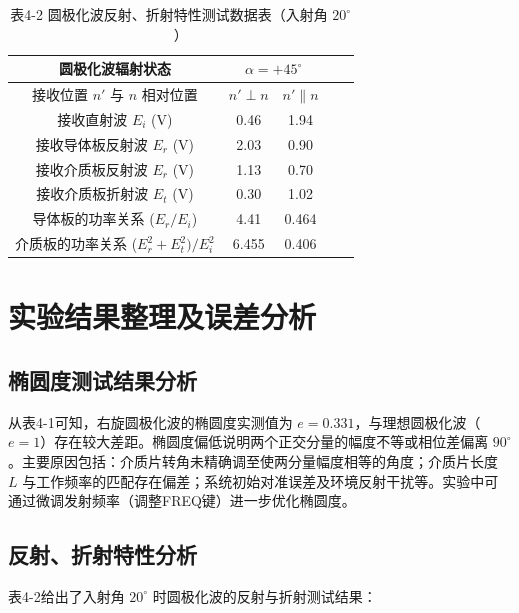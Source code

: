 \documentclass{../ElectromagneticFieldTemplate}
\begin{document}
\begin{table}[H]
    \centering
    \caption{表4-2 圆极化波反射、折射特性测试数据表（入射角 \(20^\circ\)）}
    \renewcommand{\arraystretch}{1.3}
    \begin{tabular}{|c|c|c|c|c|}
        \hline
        圆极化波辐射状态 & \multicolumn{2}{c|}{\(\alpha = +45^\circ\)} \\
        \hline
        接收位置 \(n'\) 与 \(n\) 相对位置 & \(n' \perp n\) & \(n' \parallel n\) \\
        \hline
        接收直射波 \(E_i\) (V) & 0.46 & 1.94\\
        \hline
        接收导体板反射波 \(E_r\) (V) & 2.03 & 0.90 \\
        \hline
        接收介质板反射波 \(E_r\) (V) & 1.13 & 0.70 \\
        \hline
        接收介质板折射波 \(E_t\) (V) & 0.30 & 1.02\\
        \hline
        导体板的功率关系 (\(E_r/E_i\)) & 4.41 & 0.464\\
        \hline
        介质板的功率关系 (\(E_r^2 + E_t^2)/E_i^2\) & 6.455 & 0.406\\
        \hline
    \end{tabular}
\end{table}

\section{实验结果整理及误差分析}

\subsection{椭圆度测试结果分析}
从表4-1可知，右旋圆极化波的椭圆度实测值为 \(e = 0.331\)，与理想圆极化波（\(e = 1\)）存在较大差距。椭圆度偏低说明两个正交分量的幅度不等或相位差偏离 \(90^\circ\)。主要原因包括：介质片转角未精确调至使两分量幅度相等的角度；介质片长度 \(L\) 与工作频率的匹配存在偏差；系统初始对准误差及环境反射干扰等。实验中可通过微调发射频率（调整FREQ键）进一步优化椭圆度。

\subsection{反射、折射特性分析}
表4-2给出了入射角 \(20^\circ\) 时圆极化波的反射与折射测试结果：
\end{document}
